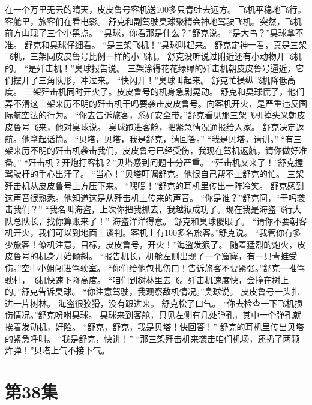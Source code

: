 \documentclass[a4paper,12pt,UTF8,twoside]{ctexbook}
\begin{document}
        在一个万里无云的晴天，皮皮鲁号客机送100多只青蛙去远方。 
        飞机平稳地飞行。客舱里，旅客们在看电影。 
        舒克和副驾驶臭球聚精会神地驾驶飞机。突然，飞机前方山现了三个小黑点。 
        “臭球，你看那是什么？”舒克说。 
        “是大鸟？”臭球拿不准。 
        舒克和臭球仔细看。 
        “是三架飞机！”臭球叫起来。 
        舒克定神一看，真是三架飞机，三架同皮皮鲁号比例一样的小飞机。 
        舒克没听说过附近还有小动物开飞机的。 
        “是歼击机！”臭球报告说。 
        三架涂得花花绿绿的歼击机朝皮皮鲁号逼近，它们摆开了三角队形，冲过来。 
        “快闪开！”臭球叫起来。 
        舒克忙操纵飞机降低高度。 
        三架歼击机同时开火了。皮皮鲁号的机身急剧晃动。 
        舒克和臭球慌了，他们弄不清这三架来历不明的歼击机干吗要袭击皮皮鲁号。向客机开火，是严重违反国际航空法的行为。 
        “你去告诉旅客，系好安全带。”舒克看见那三架飞机掉头义朝皮皮鲁号飞来，他对臭球说。 
        臭球跑进客舱，把紧急情况通报给人家。 
        舒克决定返航。他拿起话筒。 
        “贝塔，贝塔，我是舒克，请回答。” 
        “我是贝塔，请讲。” 
        “有三架来历不明的歼击机袭击我们，皮皮鲁号已经受伤，我现在驾机返航，请你做好准备。” 
        “歼击机？开炮打客机？”贝塔感到问题十分严重。 
        “歼击机又来了！”舒克握驾驶杆的手心出汗了。 
        “当心！”贝塔叮嘱舒克。他恨自己帮不上舒克的忙。 
        三架歼击机从皮皮鲁号上方压下来。 
        “嘿嘿！”舒克的耳机里传出一阵冷笑。 
        舒克感到这声音很熟悉。他知道这是从歼击机上传来的声音。 
        “你是谁？”舒克问，“干吗袭击我们？” 
        “我名叫海盗，上次你把我抓去，我越狱成功了。现在我是海盗飞行大队总队长，找你算账来了！” 
        海盗洋洋得意。 
        舒克和臭球傻眼了。 
        “请你不要朝客机开火，我们可以到地面上谈判。客机上有100多名旅客。”舒克说。 
        “我管你有多少旅客！僚机注意，目标，皮皮鲁号，开火！”海盗发狠了。 
          随着猛烈的炮火，皮皮鲁号的机身开始倾斜。 
        “报告机长，机舱左侧出现了一个窟窿，有一只青蛙受伤。”空中小姐闯进驾驶室。 
        “你们给他包扎伤口！告诉旅客不要紧张。”舒克一推驾驶杆，飞机快速下降高度。 
        “咱们到树林里去飞。歼击机速度快，会撞在树上的。”舒克告诉臭球。 
        “你注意驾驶，我观察敌机情况。”臭球说。 
        皮皮鲁号一头扎进一片树林。 
        海盗很狡猾，没有跟进来。 
        舒克松了口气。 
        “你去检查一下飞机损伤情况。”舒克吩咐臭球。 
        臭球来到客舱，只见左侧有几处弹孔，其中一个弹孔就挨着发动机，好险。 
        “舒克，舒克，我是贝塔！快回答！” 
        舒克的耳机里传出贝塔的紧急呼叫。 
        “我是舒克，快讲！” 
        “那三架歼击机来袭击咱们机场，还扔了两颗炸弹！”贝塔上气不接下气。   \chapter{第38集} 
\end{document}
